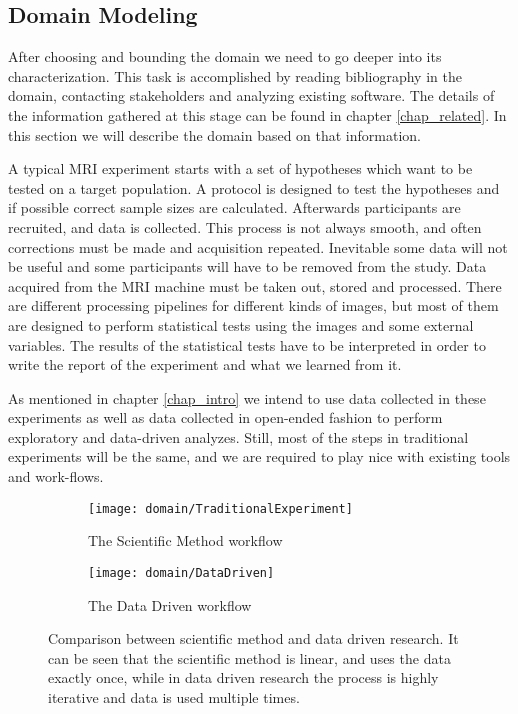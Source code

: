 \subsection{Domain Modeling}

After choosing and bounding the domain we need to go deeper into its characterization. This task is accomplished by reading bibliography in the domain, contacting stakeholders and analyzing existing software. The details of the information gathered at this stage can be found in chapter \ref{chap_related}. In this section we will describe the domain based on that information.

A typical MRI experiment starts with a set of hypotheses which want to be tested on a target population. A protocol is designed to test the hypotheses and if possible correct sample sizes are calculated. Afterwards participants are recruited, and data is collected. This process is not always smooth, and often corrections must be made and acquisition repeated. Inevitable some data will not be useful and some participants will have to be removed from the study. Data acquired from the MRI machine must be taken out, stored and processed. There are different processing pipelines for different kinds of images, but most of them are designed to perform statistical tests using the images and some external variables. The results of the statistical tests have to be interpreted in order to write the report of the experiment and what we learned from it.

As mentioned in chapter \ref{chap_intro} we intend to use data collected in these experiments as well as data collected in open-ended fashion to perform exploratory and data-driven analyzes. Still, most of the steps in traditional experiments will be the same, and we are required to play nice with existing tools and work-flows. 

\begin{figure}
\centering
\begin{subfigure}[b]{0.9\textwidth}
\texttt{[image: domain/TraditionalExperiment]}
\caption{The Scientific Method workflow}	
\end{subfigure}

\begin{subfigure}[b]{0.9\textwidth}
\texttt{[image: domain/DataDriven]}	
\caption{The Data Driven workflow}	
\end{subfigure}

\caption{\label{fig_workflows}Comparison between scientific method and data driven research. It can be seen that the scientific method is linear, and uses the data exactly once, while in data driven research the process is highly iterative and data is used multiple times.}
\end{figure}

